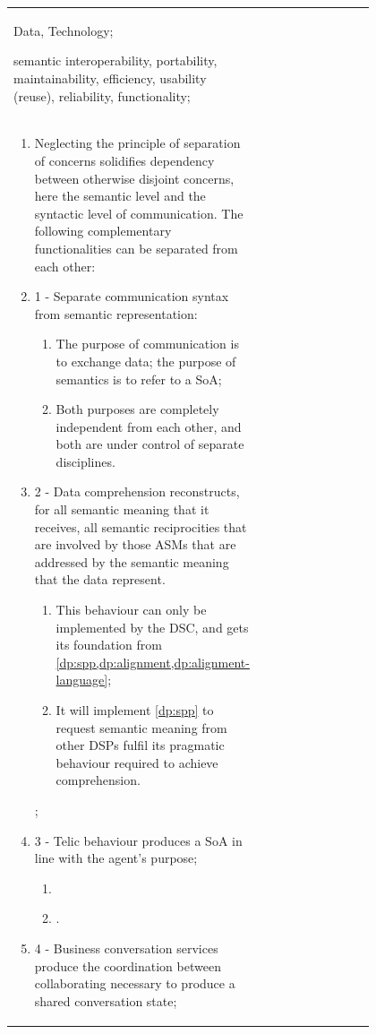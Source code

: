 \begin{xltabular}[l]{\linewidth}{@{} >{\small\raggedright\arraybackslash}p{0.47\linewidth} >{\small\raggedright\arraybackslash}X @{}}
\begin{description}[labelwidth=3.7cm,leftmargin=3.7cm+1ex,nosep,topsep=2ex,labelsep=1ex,font=\bfseries]
\item[Type of information:] Data, Technology;
\item[Quality attributes:] semantic interoperability, portability, maintainability, efficiency, usability (reuse), reliability, functionality;
\end{description}
\\
\begin{enumerate}[left=6pt, nosep]
  \item Neglecting the principle of separation of concerns solidifies dependency between otherwise disjoint concerns, here the semantic level and the syntactic level of communication. The following complementary functionalities can be separated from each other:
  \item 1 - Separate communication syntax from semantic representation:
  \begin{enumerate}
    \item The purpose of communication is to exchange data; the purpose of semantics is to refer to a SoA;
    \item Both purposes are completely independent from each other, and both are under control of separate disciplines.
  \end{enumerate}
  \item 2 - Data comprehension reconstructs, for all semantic meaning that it receives, all semantic reciprocities that are involved by those ASMs that are addressed by the semantic meaning that the data represent.
  \begin{enumerate}
    \item This behaviour can only be implemented by the DSC, and gets its foundation from \cref{dp:spp,dp:alignment,dp:alignment-language};
    \item It will implement \cref{dp:spp} to request semantic meaning from other DSPs fulfil its pragmatic behaviour required to achieve comprehension.
  \end{enumerate};
  \item 3 - Telic behaviour produces a SoA in line with the agent's purpose;
  \begin{enumerate}
    \item 
    \item .
  \end{enumerate}
  \item 4 - Business conversation services produce the coordination between collaborating necessary to produce a shared conversation state;
  \begin{enumerate}

\end{enumerate}
\end{enumerate}
\end{xltabular}
